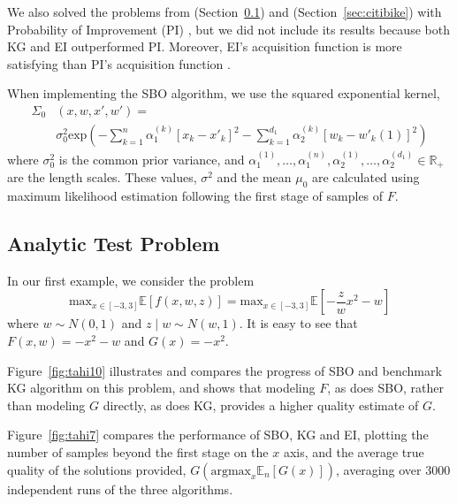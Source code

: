\documentclass{article}
\newcommand{\w}{w}
\newcommand{\z}{z}
\newcommand{\pfcomment}[1]{{\color{red} PF: #1}}
\begin{document}
We also solved the problems from (Section~\ref{sec:test}) and (Section~\ref{sec:citibike}) with Probability of Improvement (PI) \cite{brochu2010tutorial}, but we did not include its results because both KG and EI outperformed PI. Moreover, EI's acquisition function is more satisfying than PI's acquisition function \cite{brochu2010tutorial}. 

When implementing the SBO algorithm, we use the squared exponential kernel,
\begin{align*}
\Sigma_{0}&\left(x,\w,x',\w'\right)=\\  
&\sigma_{0}^{2}\mbox{exp}\left(-\sum_{k=1}^{n}\alpha_{1}^{\left(k\right)}\left[x_{k}-x'_{k}\right]^{2}-\sum_{k=1}^{d_{1}}\alpha_{2}^{\left(k\right)}\left[\w_{k}-\w'_{k}\left(1\right)\right]^{2}\right)
\end{align*}
where $\sigma_{0}^{2}$ is the common prior variance, and $\alpha_{1}^{\left(1\right)},\ldots,\alpha_{1}^{\left(n\right)},\alpha_{2}^{\left(1\right)},\ldots,\alpha_{2}^{\left(d_{1}\right)}\in\mathbb{R}_{+}$
are the length scales. These values, $\sigma^{2}$ and the mean $\mu_{0}$ are calculated using maximum likelihood estimation following the first stage of samples of $F$.

\subsection{Analytic Test Problem}
\label{sec:test}
In our first example, we consider the problem
\[
\mbox{max}_{x\in\left[-3,3\right]}\mathbb{E}\left[f\left(x,\w,\z\right)\right]=\mbox{max}_{x\in\left[-3,3\right]}\mathbb{E}\left[-\frac{\z}{\w}x^{2}-\w\right]
\]
where $\w\sim N\left(0,1\right)$ and $\z\mid \w\sim N\left(\w,1\right)$. It is easy to see that $F\left(x,\w \right)=-x^{2}-\w$ and $G(x)=-x^{2}$.

Figure~\ref{fig:tahi10} illustrates and compares the progress of SBO and benchmark KG algorithm on this problem, and shows that modeling $F$, as does SBO, rather than modeling $G$ directly, as does KG, provides a higher quality estimate of $G$.

Figure~\ref{fig:tahi7} compares the performance of SBO, KG and EI, plotting the number of samples beyond the first stage on the $x$ axis, and the average true quality of the solutions provided, $G(\mathrm{argmax}_x \mathbb{E}_n[G(x)])$, averaging over 3000 independent runs of the three algorithms.


\end{document}
